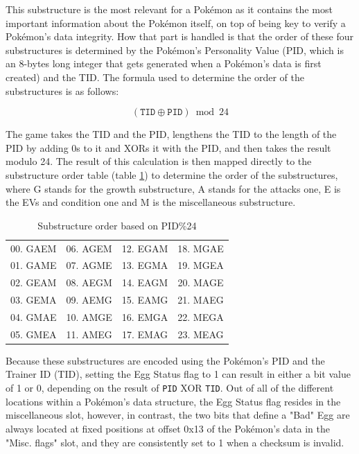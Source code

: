 \documentclass[a4paper]{usiinfbachelorproject}
\begin{document}
This substructure is the most relevant for a Pokémon as it contains the most important information about the Pokémon itself, on top of being key to verify a Pokémon's data integrity. How that part is handled is that the order of these four substructures is determined by the Pokémon's Personality Value (PID, which is an 8-bytes long integer that gets generated when a Pokémon's data is first created) and the TID. The formula used to determine the order of the substructures is as follows:

\begin{equation*}
	\left( \texttt{TID} \oplus \texttt{PID} \right) \bmod 24
	\label{eq:substructure_order_formula}
\end{equation*}

The game takes the TID and the PID, lengthens the TID to the length of the PID by adding 0s to it and XORs it with the PID, and then takes the result modulo 24. The result of this calculation is then mapped directly to the substructure order table (table \ref{tab:substructure-order}) to determine the order of the substructures, where G stands for the growth substructure, A stands for the attacks one, E is the EVs and condition one and M is the miscellaneous substructure.

\begin{table}[h!]
	\centering
	\begin{tabular}{cccc}
		\toprule
		00. GAEM & 06. AGEM & 12. EGAM & 18. MGAE \\
		01. GAME & 07. AGME & 13. EGMA & 19. MGEA \\
		02. GEAM & 08. AEGM & 14. EAGM & 20. MAGE \\
		03. GEMA & 09. AEMG & 15. EAMG & 21. MAEG \\
		04. GMAE & 10. AMGE & 16. EMGA & 22. MEGA \\
		05. GMEA & 11. AMEG & 17. EMAG & 23. MEAG \\
		\bottomrule
	\end{tabular}
	\caption{Substructure order based on PID\%24}
	\label{tab:substructure-order}
\end{table}


Because these substructures are encoded using the Pokémon’s PID and the Trainer ID (TID), setting the Egg Status flag to 1 can result in either a bit value of 1 or 0, depending on the result of \texttt{PID} XOR \texttt{TID}. Out of all of the different locations within a Pokémon's data structure, the Egg Status flag resides in the miscellaneous slot, however, in contrast, the two bits that define a "Bad" Egg are always located at fixed positions at offset 0x13 of the Pokémon's data in the "Misc. flags" slot, and they are consistently set to 1 when a checksum is invalid.
\end{document}

